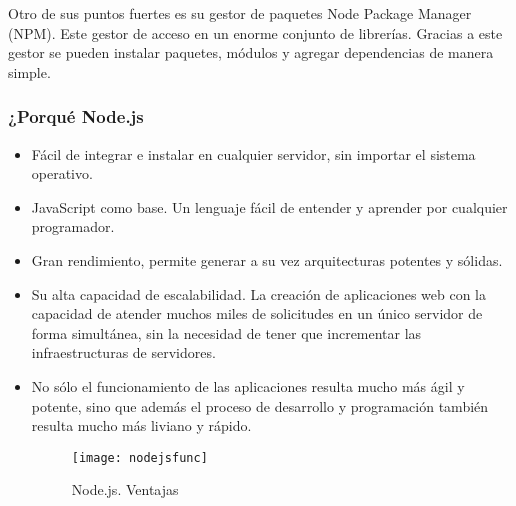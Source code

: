 
Otro de sus puntos fuertes es su gestor de paquetes Node Package Manager  (NPM). Este gestor de acceso en un enorme conjunto de librerías. Gracias a este gestor se pueden instalar paquetes, módulos y agregar dependencias de manera simple.

\subsubsection{¿Porqué Node.js}
\begin{itemize}
    \item Fácil de integrar e instalar en cualquier servidor, sin importar el sistema operativo.
    \item JavaScript como base. Un lenguaje fácil de entender y aprender por cualquier programador.
    \item Gran rendimiento, permite generar a su vez arquitecturas potentes y sólidas.
    \item Su alta capacidad de escalabilidad. La creación de aplicaciones web con la capacidad de atender muchos miles de solicitudes en un único servidor de forma simultánea, sin la necesidad de tener que incrementar las infraestructuras de servidores.
    \item No sólo el funcionamiento de las aplicaciones resulta mucho más ágil y potente, sino que además el proceso de desarrollo y programación también resulta mucho más liviano y rápido.
        
    \begin{figure}[h]
        \centering
        \texttt{[image: nodejsfunc]}
        \caption{Node.js. Ventajas }
        \label{fig:nodejs}
    \end{figure}
\end{itemize}


